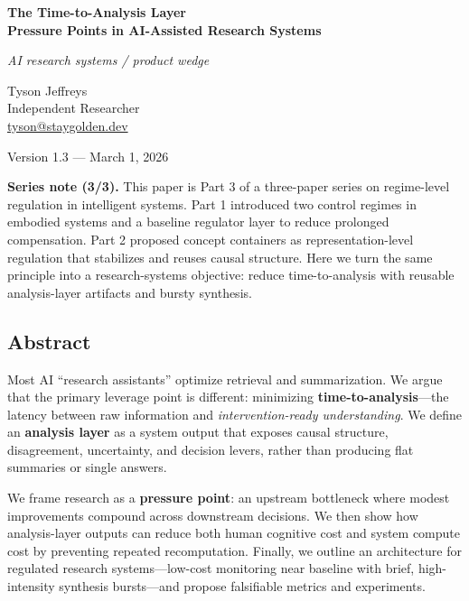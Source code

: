 \documentclass[11pt]{article}
\begin{document}
\begin{titlepage}
\thispagestyle{empty}
\raggedright

\vspace*{0.62\textheight}

{\Large\bfseries The Time-to-Analysis Layer\\\large Pressure Points in AI-Assisted Research
Systems\par}


\vspace{0.4em}
{\large\itshape AI research systems / product wedge\par}

\vspace{1.6em}

Tyson Jeffreys\\
Independent Researcher\\
\href{mailto:tyson@staygolden.dev}{tyson@staygolden.dev}

\vspace{1.6em}

Version 1.3 --- March 1, 2026

\end{titlepage}


\noindent\textbf{Series note (3/3).} This paper is Part 3 of a three-paper series on regime-level regulation in intelligent systems. Part 1 introduced two control regimes in embodied systems and a baseline regulator layer to reduce prolonged compensation. Part 2 proposed concept containers as representation-level regulation that stabilizes and reuses causal structure. Here we turn the same principle into a research-systems objective: reduce time-to-analysis with reusable analysis-layer artifacts and bursty synthesis.\par\medskip
\hypertarget{abstract}{%
\subsection{Abstract}\label{abstract}}

Most AI ``research assistants'' optimize retrieval and summarization. We
argue that the primary leverage point is different: minimizing
\textbf{time-to-analysis}---the latency between raw information and
\emph{intervention-ready understanding}. We define an \textbf{analysis
layer} as a system output that exposes causal structure, disagreement,
uncertainty, and decision levers, rather than producing flat summaries
or single answers.

We frame research as a \textbf{pressure point}: an upstream bottleneck
where modest improvements compound across downstream decisions. We then
show how analysis-layer outputs can reduce both human cognitive cost and
system compute cost by preventing repeated recomputation. Finally, we
outline an architecture for regulated research systems---low-cost
monitoring near baseline with brief, high-intensity synthesis
bursts---and propose falsifiable metrics and experiments.
\end{document}
